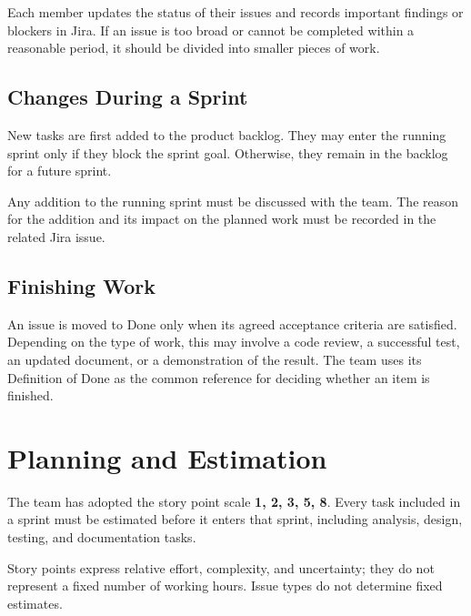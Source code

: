 \documentclass[12pt,a4paper]{article}
\begin{document}
Each member updates the status of their issues and records important
findings or blockers in Jira. If an issue is too broad or cannot be
completed within a reasonable period, it should be divided into smaller
pieces of work.

\subsection{Changes During a Sprint}

New tasks are first added to the product backlog. They may enter
the running sprint only if they block the sprint goal.
Otherwise, they remain in the backlog for a future sprint.

Any addition to the running sprint must be discussed with the team.
The reason for the addition and its impact on the planned work
must be recorded in the related Jira issue.

\subsection{Finishing Work}

An issue is moved to Done only when its agreed acceptance criteria are
satisfied. Depending on the type of work, this may involve a code review,
a successful test, an updated document, or a demonstration of the result.
The team uses its Definition of Done as the common reference
for deciding whether an item is finished.


\section{Planning and Estimation}

The team has adopted the story point scale
\textbf{1, 2, 3, 5, 8}. Every task included in a sprint must
be estimated before it enters that sprint, including analysis,
design, testing, and documentation tasks.

Story points express relative effort, complexity, and uncertainty;
they do not represent a fixed number of working hours.
Issue types do not determine fixed estimates.
\end{document}
